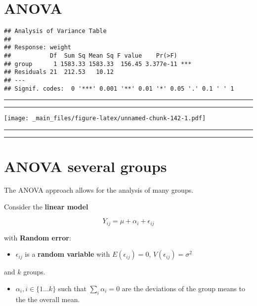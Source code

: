 \documentclass[
]{book}
\providecommand{\tightlist}{%
  \setlength{\itemsep}{0pt}\setlength{\parskip}{0pt}}
\begin{document}
\hypertarget{anova-2}{%
\section{ANOVA}\label{anova-2}}

\begin{verbatim}
## Analysis of Variance Table
## 
## Response: weight
##           Df  Sum Sq Mean Sq F value    Pr(>F)    
## group      1 1583.33 1583.33  156.45 3.377e-11 ***
## Residuals 21  212.53   10.12                      
## ---
## Signif. codes:  0 '***' 0.001 '**' 0.01 '*' 0.05 '.' 0.1 ' ' 1
\end{verbatim}

\begin{center}\rule{0.5\linewidth}{0.5pt}\end{center}

\begin{center}\rule{0.5\linewidth}{0.5pt}\end{center}

\texttt{[image: \_main\_files/figure-latex/unnamed-chunk-142-1.pdf]}

\begin{center}\rule{0.5\linewidth}{0.5pt}\end{center}

\begin{center}\rule{0.5\linewidth}{0.5pt}\end{center}

\hypertarget{anova-several-groups}{%
\section{ANOVA several groups}\label{anova-several-groups}}

The ANOVA approach allows for the analysis of many groups.

Consider the \textbf{linear model}

\[Y_{ij} = \mu + \alpha_i +\epsilon_{ij}\]

with \textbf{Random error}:

\begin{itemize}
\tightlist
\item
  \(\epsilon_{ij}\) is a \textbf{random variable} with \(E(\epsilon_{ij})=0\), \(V(\epsilon_{ij})=\sigma^2\)
\end{itemize}

and \(k\) groups.

\begin{itemize}
\tightlist
\item
  \(\alpha_i, i \in\{1...k\}\) such that \(\sum_i \alpha_i=0\) are the deviations of the group means to the the overall mean.
\end{itemize}
\end{document}
